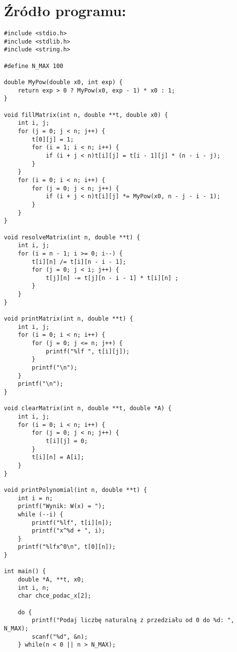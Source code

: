 \documentclass[11pt]{article}
\begin{document}
\section{Źródło programu:}

\begin{lstlisting}
#include <stdio.h>
#include <stdlib.h>
#include <string.h>

#define N_MAX 100

double MyPow(double x0, int exp) {
    return exp > 0 ? MyPow(x0, exp - 1) * x0 : 1;
}

void fillMatrix(int n, double **t, double x0) {
    int i, j;
    for (j = 0; j < n; j++) {
        t[0][j] = 1;
        for (i = 1; i < n; i++) {
            if (i + j < n)t[i][j] = t[i - 1][j] * (n - i - j);
        }
    }
    for (i = 0; i < n; i++) {
        for (j = 0; j < n; j++) {
            if (i + j < n)t[i][j] *= MyPow(x0, n - j - i - 1);
        }
    }
}

void resolveMatrix(int n, double **t) {
    int i, j;
    for (i = n - 1; i >= 0; i--) {
        t[i][n] /= t[i][n - i - 1];
        for (j = 0; j < i; j++) {
            t[j][n] -= t[j][n - i - 1] * t[i][n] ;
        }
    }
}

void printMatrix(int n, double **t) {
    int i, j;
    for (i = 0; i < n; i++) {
        for (j = 0; j <= n; j++) {
            printf("%lf ", t[i][j]);
        }
        printf("\n");
    }
    printf("\n");
}

void clearMatrix(int n, double **t, double *A) {
    int i, j;
    for (i = 0; i < n; i++) {
        for (j = 0; j < n; j++) {
            t[i][j] = 0;
        }
        t[i][n] = A[i];
    }
}

void printPolynomial(int n, double **t) {
    int i = n;
    printf("Wynik: W(x) = ");
    while (--i) {
        printf("%lf", t[i][n]);
        printf("x^%d + ", i);
    }
    printf("%lfx^0\n", t[0][n]);
}

int main() {
    double *A, **t, x0;
    int i, n;
    char chce_podac_x[2];

    do {
        printf("Podaj liczbę naturalną z przedziału od 0 do %d: ", N_MAX);
        scanf("%d", &n);	
    } while(n < 0 || n > N_MAX);
    

\end{lstlisting}
\end{document}
